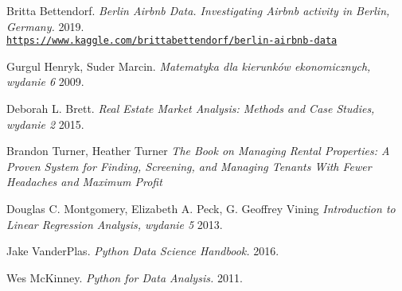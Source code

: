 \begin{thebibliography}{9}
    Britta Bettendorf.
    \textit{Berlin Airbnb Data.
    Investigating Airbnb activity in Berlin, Germany.} 2019.
    \\\texttt{\url{https://www.kaggle.com/brittabettendorf/berlin-airbnb-data}}

    Gurgul Henryk, Suder Marcin.
    \textit{Matematyka dla kierunków ekonomicznych, wydanie 6} 2009.

    Deborah L. Brett.
    \textit{Real Estate Market Analysis: Methods and Case Studies, wydanie 2} 2015.

    Brandon Turner, Heather Turner
    \textit{The Book on Managing Rental Properties: A Proven System for Finding, Screening, and Managing Tenants With Fewer Headaches and Maximum Profit}

    Douglas C. Montgomery, Elizabeth A. Peck, G. Geoffrey Vining
    \textit{Introduction to Linear Regression Analysis, wydanie 5} 2013.

    Jake VanderPlas.
    \textit{Python Data Science Handbook.} 2016.

    Wes McKinney.
    \textit{Python for Data Analysis.} 2011.


\end{thebibliography}